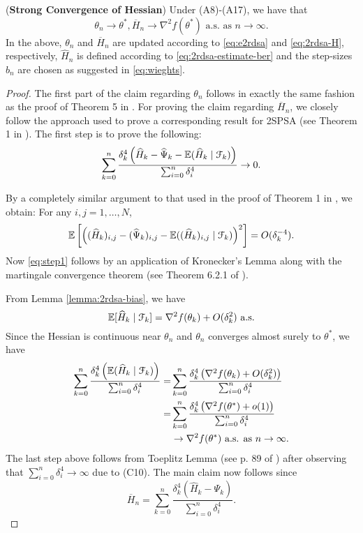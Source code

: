\begin{theorem}(\textbf{Strong Convergence of Hessian})
\label{thm:2rdsa-H}
Under (A8)-(A17), we have that 
$$\theta_n \rightarrow \theta^*, \overline H_n \rightarrow \nabla^2 f(\theta^*) \text{ a.s. as } n\rightarrow \infty.$$ 
In the above, $\theta_n$ and $\overline H_n$ are updated according to \eqref{eq:e2rdsa} and \eqref{eq:2rdsa-H}, respectively, $\widehat H_n$ is defined according to \eqref{eq:2rdsa-estimate-ber} and the step-sizes $b_n$ are chosen as suggested in \eqref{eq:wieghts}. 
\end{theorem}
\begin{proof}
The first part of the claim regarding $\theta_n$ follows in exactly the same fashion as the proof of Theorem 5 in \cite{prashanth2015rdsa}.  
For proving the claim regarding $\overline H_n$, we closely follow the approach used to prove a corresponding result for 2SPSA (see Theorem 1 in \cite{spall-jacobian}). 
The first step is to prove the following:
\begin{align}
\sum_{k=0}^n \dfrac{\delta_k^4 \left(\widehat H_k - \widehat \Psi_k - \mathbb{E}(\widehat H_k \mid \mathcal{F}_k)\right)}{\sum_{i=0}^n \delta_i^4} \rightarrow 0.
\label{eq:step1}
\end{align}

By a completely similar argument to that used in the proof of Theorem 1 in \cite{spall-jacobian}, we obtain: For any $i,j = 1,\ldots,N$,
\begin{align*}
\mathbb{E} \left[\left((\widehat {H}_k)_{i,j} - (\widehat {\Psi}_k)_{i,j} - \mathbb{E}((\widehat {H}_k)_{i,j} \mid \mathcal{F}_k)\right)^2\right] = O(\delta_k^{-4}).
\end{align*}
Now \eqref{eq:step1} follows by an application of Kronecker's Lemma along with the martingale convergence theorem (see Theorem 6.2.1 of \cite{lahaprobability}).

From Lemma \ref{lemma:2rdsa-bias}, we have 
$$ \mathbb{E}[ \widehat H_k \mid \mathcal{F}_k] = \nabla^2 f(\theta_k) + O(\delta_k^2) \text{ a.s.}$$
Since the Hessian is continuous near $\theta_n$ and $\theta_n$ converges almost surely to $\theta^*$, we have
\begin{align*}
\sum_{k=0}^n \dfrac{\delta_k^4 \left(\mathbb{E}(\widehat H_k \mid \mathcal{F}_k)\right)}{\sum_{i=0}^n \delta_i^4} 
=&\sum_{k=0}^n \dfrac{\delta_k^4 \left(\nabla^2 f(\theta_k) + O(\delta_k^2)\right)}{\sum_{i=0}^n \delta_i^4}\\
=&\sum_{k=0}^n \dfrac{\delta_k^4 \left(\nabla^2 f(\theta^*) + o(1)\right)}{\sum_{i=0}^n \delta_i^4}\\
&\rightarrow \nabla^2 f(\theta^*) \text{ a.s. as } n \rightarrow \infty.
\end{align*}
The last step above follows from Toeplitz Lemma (see p. 89 of \cite{lahaprobability}) after observing that $\sum_{i=0}^n \delta_i^4 \rightarrow \infty$ due to (C10). 
The main claim now follows since 
$$ \overline H_n = \sum_{k=0}^n \dfrac{\delta_k^4 \left(\widehat H_k - \Psi_k \right)}{\sum_{i=0}^n \delta_i^4}.$$
\end{proof}


